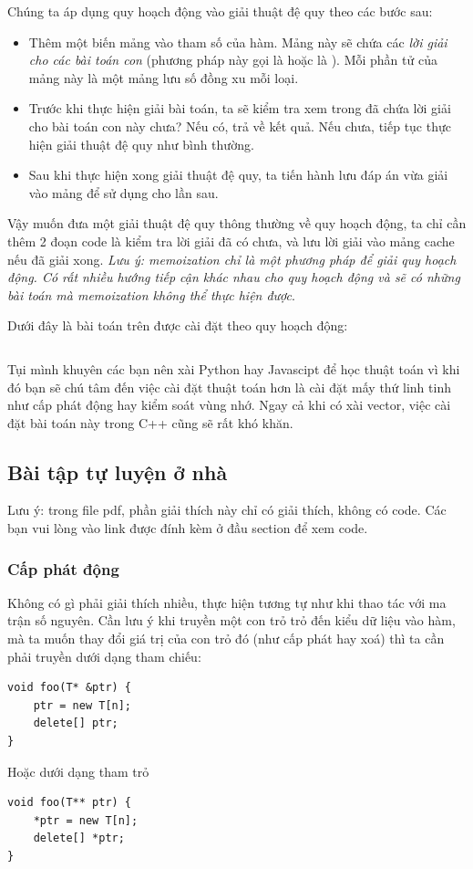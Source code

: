 \documentclass[main.tex]{subfiles}
\begin{document}
Chúng ta áp dụng quy hoạch động vào giải thuật đệ quy theo các bước sau:
\begin{itemize}
    \item Thêm một biến mảng vào tham số của hàm. Mảng này sẽ chứa các \textit{lời giải cho các bài toán con} (phương pháp này gọi là  hoặc là ). Mỗi phần tử của mảng này là một mảng lưu số đồng xu mỗi loại.
    \item Trước khi thực hiện giải bài toán, ta sẽ kiểm tra xem trong  đã chứa lời giải cho bài toán con này chưa? Nếu có, trả về kết quả. Nếu chưa, tiếp tục thực hiện giải thuật đệ quy như bình thường.
    \item Sau khi thực hiện xong giải thuật đệ quy, ta tiến hành lưu đáp án vừa giải vào mảng  để sử dụng cho lần sau.
\end{itemize}
Vậy muốn đưa một giải thuật đệ quy thông thường về quy hoạch động, ta chỉ cần thêm 2 đoạn code là kiểm tra lời giải đã có chưa, và lưu lời giải vào mảng \code cache nếu đã giải xong.
\textit{Lưu ý: memoization chỉ là một phương pháp để giải quy hoạch động. Có rất nhiều hướng tiếp cận khác nhau cho quy hoạch động và sẽ có những bài toán mà memoization không thể thực hiện được}.


Dưới đây là bài toán trên được cài đặt theo quy hoạch động:
\inputminted[linenos,breaklines]{cpp}{answer_sources/QuyHoachDong_ToiUu.cpp}

{\scriptsize Tụi mình khuyên các bạn nên xài Python hay Javascipt để học thuật toán vì khi đó bạn sẽ chú tâm đến việc cài đặt thuật toán hơn là cài đặt mấy thứ linh tinh như cấp phát động hay kiểm soát vùng nhớ. Ngay cả khi có xài vector, việc cài đặt bài toán này trong C++ cũng sẽ rất khó khăn}.



\subsection{Bài tập tự luyện ở nhà}
Lưu ý: trong file pdf, phần giải thích này chỉ có giải thích, không có code. Các bạn vui lòng vào link được đính kèm ở đầu section để xem code.
\subsubsection{Cấp phát động}
Không có gì phải giải thích nhiều, thực hiện tương tự như khi thao tác với ma trận số nguyên.
Cần lưu ý khi truyền một con trỏ trỏ đến kiểu dữ liệu  vào hàm, mà ta muốn thay đổi giá trị của con trỏ đó (như cấp phát hay xoá) thì ta cần phải truyền dưới dạng tham chiếu: 
\begin{verbatim}
void foo(T* &ptr) {
    ptr = new T[n];
    delete[] ptr;
}
\end{verbatim}
Hoặc dưới dạng tham trỏ
\begin{verbatim}
void foo(T** ptr) {
    *ptr = new T[n];
    delete[] *ptr;
}
\end{verbatim}
\end{document}
